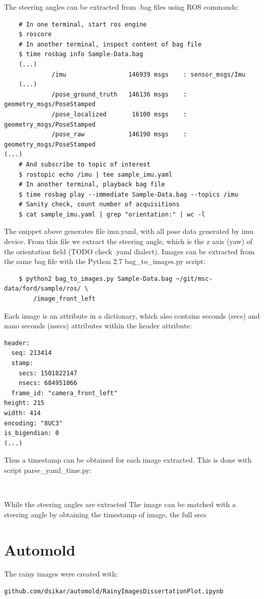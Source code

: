 The steering angles can be extracted from .bag files using ROS commands:
\begin{verbatim}
    # In one terminal, start ros engine
    $ roscore
    # In another terminal, inspect content of bag file
    $ time rosbag info Sample-Data.bag
    (...)
             /imu                 146939 msgs    : sensor_msgs/Imu             
    (...)
             /pose_ground_truth   146136 msgs    : geometry_msgs/PoseStamped   
             /pose_localized       16100 msgs    : geometry_msgs/PoseStamped   
             /pose_raw            146190 msgs    : geometry_msgs/PoseStamped   
(...)
    # And subscribe to topic of interest 
    $ rostopic echo /imu | tee sample_imu.yaml
    # In another terminal, playback bag file
    $ time rosbag play --immediate Sample-Data.bag --topics /imu
    # Sanity check, count number of acquisitions
    $ cat sample_imu.yaml | grep "orientation:" | wc -l
\end{verbatim}
The snippet above generates file imu.yaml, with all pose data generated by imu device. From this file we extract the steering angle, which is the z axis (yaw) of the orientation field (TODO check .yaml dialect). 
Images can be extracted from the same bag file with the Python 2.7 bag\_to\_images.py script:
\begin{verbatim}
    $ python2 bag_to_images.py Sample-Data.bag ~/git/msc-data/ford/sample/ros/ \
        /image_front_left
\end{verbatim}
Each image is an attribute in a dictionary, which also contains seconds (secs) and nano seconds (nsecs) attributes within the header attribute:
\begin{verbatim}
header: 
  seq: 213414
  stamp: 
    secs: 1501822147
    nsecs: 684951066
  frame_id: "camera_front_left"
height: 215
width: 414
encoding: "8UC3"
is_bigendian: 0
(...)
\end{verbatim}
Thus a timestamp can be obtained for each image extracted. This is done with script parse\_yaml\_time.py:
\begin{verbatim}
    
\end{verbatim}
While the steering angles are extracted 
The image can be matched with a steering angle by obtaining the timestamp of image, the full secs 

\section{Automold}
The rainy images were created with:  
\begin{verbatim}
github.com/dsikar/automold/RainyImagesDissertationPlot.ipynb
\end{verbatim}

